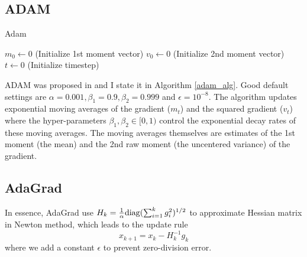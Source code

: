 \documentclass[conference,onecolumn,12pt]{IEEEtran}
\renewcommand{\(}{\left(}
\renewcommand{\)}{\right)}
\numberwithin{equation}{section}
\numberwithin{figure}{section}
\numberwithin{table}{section}
\theoremstyle{definition}
\begin{document}
\subsection{ADAM}
\begin{algorithm}
  \label{adam_alg}
  \caption{Adam}
    \SetAlgoNoLine %
    \BlankLine
    $m_0\gets 0$ (Initialize 1st moment vector)\;
    $v_0\gets 0$ (Initialize 2nd moment vector)\;
    $t\gets 0$ (Initialize timestep)\;

    \end{algorithm}
\DecMargin{1em}
ADAM was proposed in \cite{kingma2014adam} and I state it in Algorithm \ref{adam_alg}. Good default settings are $\alpha=0.001, \beta_1=0.9, \beta_2=0.999$ and $\epsilon = 10^{-8}$. The algorithm updates exponential moving averages of the gradient ($m_t$) and the squared gradient
($v_t$) where the hyper-parameters $\beta_1, \beta_2\in [0,1)$ control the exponential decay rates of these moving
averages. The moving averages themselves are estimates of the 1st moment (the mean) and the 2nd raw moment (the uncentered variance) of the gradient. 

\subsection{AdaGrad}
In essence, AdaGrad \cite{duchi2011adaptive} use $H_k = \frac{1}{\alpha} {\rm diag} (\sum_{i=1}^k g_i^2)^{1/2}$ to approximate Hessian matrix in Newton method, which leads to the update rule
\begin{equation}\label{ess_grad}
  x_{k+1} = x_k - H_k^{-1} g_k
\end{equation}
where we add a constant $\epsilon$ to prevent zero-division error.
\end{document}
